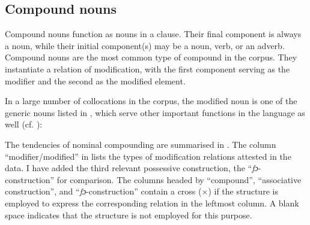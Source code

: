 \subsection{Compound nouns}\label{sec:4.4.2}

Compound nouns function as nouns in a clause. Their final component is always a noun, while their initial component(s) may be a noun, verb, or an adverb. Compound nouns are the most common type of compound in the corpus. They instantiate a relation of modification, with the first component serving as the modifier and the second as the modified element. 


In a large number of collocations in the corpus, the modified noun is one of the generic nouns listed in , which serve other important functions in the language as well (cf. \citealt[252]{Faraclas1996}):


The tendencies of nominal compounding are summarised in . The column “modifier/modified” in  lists the types of modification relations attested in the data. I have added the third relevant possessive construction, the “\textit{fɔ}{}-construction” for comparison. The columns headed by “compound”, “associative construction”, and “\textit{fɔ}{}-construc\-tion” contain a cross ($\times$) if the structure is employed to express the corresponding relation in the leftmost column. A blank space indicates that the structure is not employed for this purpose. 

